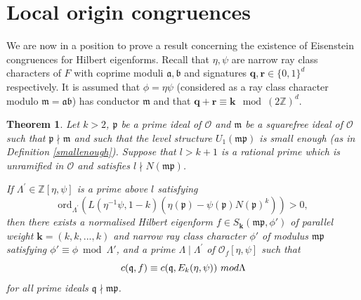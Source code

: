 \documentclass[a4paper,oneside]{amsart}
\theoremstyle{plain}
\newtheorem{thm}{Theorem}[section]
\theoremstyle{definition}
\begin{document}
\section{Local origin congruences}
We are now in a position to prove a result concerning the existence of Eisenstein congruences for Hilbert eigenforms. Recall that $\eta,\psi$ are narrow ray class characters of $F$ with coprime moduli $\mathfrak{a},\mathfrak{b}$ and signatures $\textbf{q},\textbf{r}\in\{0,1\}^d$ respectively. It is assumed that $\phi = \eta\psi$ (considered as a ray class character modulo $\mathfrak{m} = \mathfrak{a}\mathfrak{b}$) has conductor $\mathfrak{m}$ and that $\textbf{q}+\textbf{r} \equiv \textbf{k} \mod (2\mathbb{Z})^d$. 

\begin{thm}
\label{thm:existence}
Let $k>2$, $\mathfrak{p}$ be a prime ideal of $\mathcal{O}$ and $\mathfrak{m}$ be a squarefree ideal of $\mathcal{O}$ such that $\mathfrak{p} \nmid \mathfrak{m}$ and such that the level structure $U_1(\mathfrak{mp})$ is small enough (as in Definition \ref{smallenough}). Suppose that $l > k+1$ is a rational prime which is unramified in $\mathcal{O}$ and satisfies $l\nmid N(\mathfrak{mp})$.

If $\Lambda^\prime \in \mathbb{Z}[\eta, \psi]$ is a prime above $l$ satisfying
\begin{equation*}
    \text{ord}_{\Lambda^\prime}(L(\eta^{-1}\psi, 1-k)(\eta(\mathfrak{p})-\psi(\mathfrak{p})N(\mathfrak{p})^k)) > 0,
\end{equation*}
then there exists a normalised Hilbert eigenform $f \in S_{\textbf{k}}(\mathfrak{mp},\phi')$ of parallel weight $\textbf{k} = (k,k,...,k)$ and narrow ray class character $\phi'$ of modulus $\mathfrak{mp}$ satisfying $\phi'\equiv \phi \bmod \Lambda'$, and a prime $\Lambda \mid \Lambda^\prime$ of $\mathcal{O}_f[\eta, \psi]$ such that
\begin{equation*}
    c(\mathfrak{q},f) \equiv c(\mathfrak{q},E_k(\eta, \psi)) \ \textnormal{mod } \Lambda
\end{equation*} for all prime ideals $\mathfrak{q} \nmid \mathfrak{mp}$.
\end{thm}
\end{document}
